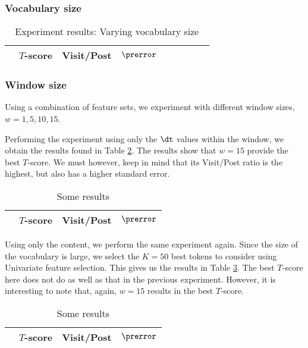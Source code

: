 \subsubsection{Vocabulary size}
\begin{table}
	\footnotesize
\begin{center}
	\begin{tabular}{|l|c|c|c|c|c|c|c|c|}
	\hline
& $T$-score			   &	Visit/Post & 	$\prerror$\\
	\hline
	
	\hline
	\end{tabular}
\end{center}
	\caption{Experiment results: Varying vocabulary size}
	\label{table:vocab_exp}
\end{table}



\subsubsection{Window size}
Using a combination of feature sets, we experiment with different window sizes, 
$w = 1, 5, 10, 15$.

Performing the experiment using only the $\dt$ values within the window, we 
obtain the results found in Table \ref{tbl:par_tune_dt}. The results show that 
$w=15$ provide the best $T$-score. We must however, keep in mind that its 
Visit/Post ratio is the highest, but also has a higher standard error.

\begin{table}
\begin{center}
\begin{tabular}{| l | c | c | c |}
\hline
& $T$-score			   &	Visit/Post & 	$\prerror$\\
\hline
	
\hline
\end{tabular}
\end{center}
\caption{Some results}\label{tbl:par_tune_dt}
\end{table}

Using only the content, we perform the same experiment again. Since the size of 
the vocabulary is large, we select the $K = 50$ best tokens to consider using 
Univariate feature selection. This gives us the results in Table 
\ref{tbl:par_tune_content}. The best $T$-score here does not do as well as that 
in the previous experiment. However, it is interesting to note that, again, 
$w=15$ results in the best $T$-score.

\begin{table}
\begin{center}
\begin{tabular}{| l | c | c | c |}
\hline
& $T$-score			   &	Visit/Post & 	$\prerror$\\
\hline

	
\hline
\end{tabular}
\end{center}
\caption{Some results}\label{tbl:par_tune_content}
\end{table}

